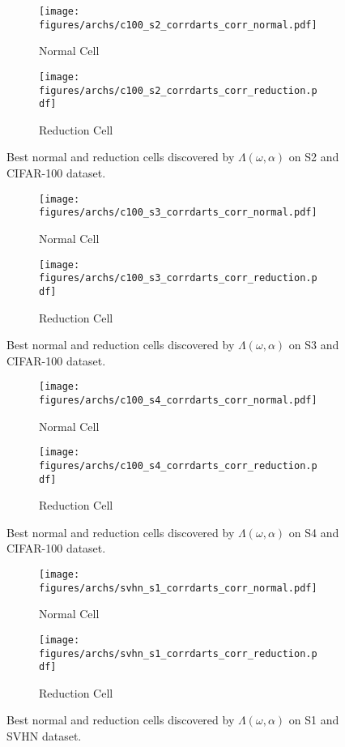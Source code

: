 \documentclass{article} \usepackage{fancyhdr, iclr2023_conference, times}
\begin{document}
\begin{figure}[h]
    \centering
    \begin{subfigure}[h]{0.5\textwidth}
        \centering
        \texttt{[image: figures/archs/c100\_s2\_corrdarts\_corr\_normal.pdf]}
        \caption{Normal Cell}
    \end{subfigure}\begin{subfigure}[h]{0.5\textwidth}
        \centering
        \texttt{[image: figures/archs/c100\_s2\_corrdarts\_corr\_reduction.pdf]}
        \caption{Reduction Cell}
    \end{subfigure}
    \caption{Best normal and reduction cells discovered by $\Lambda(\omega, \alpha)$ on S2 and CIFAR-100 dataset.}
\end{figure}
\begin{figure}[h]
    \centering
    \begin{subfigure}[h]{0.5\textwidth}
        \centering
        \texttt{[image: figures/archs/c100\_s3\_corrdarts\_corr\_normal.pdf]}
        \caption{Normal Cell}
    \end{subfigure}\begin{subfigure}[h]{0.5\textwidth}
        \centering
        \texttt{[image: figures/archs/c100\_s3\_corrdarts\_corr\_reduction.pdf]}
        \caption{Reduction Cell}
    \end{subfigure}
    \caption{Best normal and reduction cells discovered by $\Lambda(\omega, \alpha)$ on S3 and CIFAR-100 dataset.}
\end{figure}
\begin{figure}[h]
    \centering
    \begin{subfigure}[h]{0.5\textwidth}
        \centering
        \texttt{[image: figures/archs/c100\_s4\_corrdarts\_corr\_normal.pdf]}
        \caption{Normal Cell}
    \end{subfigure}\begin{subfigure}[h]{0.5\textwidth}
        \centering
        \texttt{[image: figures/archs/c100\_s4\_corrdarts\_corr\_reduction.pdf]}
        \caption{Reduction Cell}
    \end{subfigure}
    \caption{Best normal and reduction cells discovered by $\Lambda(\omega, \alpha)$ on S4 and CIFAR-100 dataset.}
\end{figure}
\begin{figure}[h]
    \centering
    \begin{subfigure}[h]{0.5\textwidth}
        \centering
        \texttt{[image: figures/archs/svhn\_s1\_corrdarts\_corr\_normal.pdf]}
        \caption{Normal Cell}
    \end{subfigure}\begin{subfigure}[h]{0.5\textwidth}
        \centering
        \texttt{[image: figures/archs/svhn\_s1\_corrdarts\_corr\_reduction.pdf]}
        \caption{Reduction Cell}
    \end{subfigure}
    \caption{Best normal and reduction cells discovered by $\Lambda(\omega, \alpha)$ on S1 and SVHN dataset.}
\end{figure}
\end{document}
